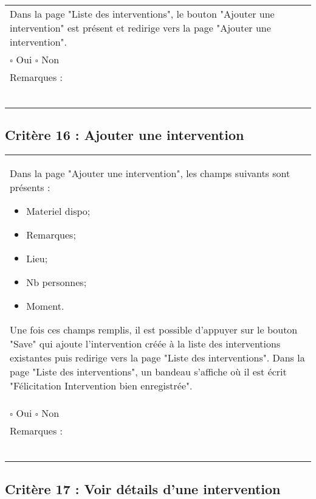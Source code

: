 	\begin{center}
    	 		\begin{tabular}[h]{|p{}|}
			\hline
				Dans la page "Liste des interventions", le bouton "Ajouter une intervention" est présent et redirige vers la page "Ajouter une intervention". \\
				$\square$ Oui  \hfill \hfill $\square$ Non \\\hline Remarques : \\ ~\\
			 \\\hline
     		\end{tabular}
  		\end{center}	
  		
  		
  	\subsection*{Critère 16 : Ajouter une intervention}
	
	\begin{center}
    	 		\begin{tabular}[h]{|p{}|}
			\hline
				Dans la page "Ajouter une intervention", les champs suivants sont présents : 
				\begin{itemize}
					\item Materiel dispo;
					\item Remarques;
					\item Lieu;
					\item Nb personnes;
					\item Moment.
				\end{itemize}
				Une fois ces champs remplis, il est possible d'appuyer sur le bouton "Save" qui ajoute l'intervention créée à la liste des interventions existantes puis redirige vers la page "Liste des interventions". Dans la page "Liste des interventions", un bandeau s'affiche où il est écrit "Félicitation Intervention bien enregistrée".\\
				$\square$ Oui  \hfill \hfill $\square$ Non \\\hline Remarques : \\ ~\\
			 \\\hline
     		\end{tabular}
  		\end{center}	
  		
  		
  		\subsection*{Critère 17 : Voir détails d'une intervention}
	
